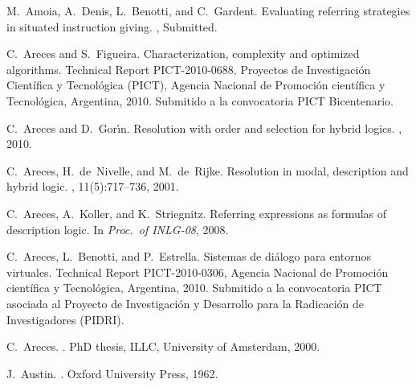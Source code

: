 \documentclass[11pt]{article}
\begin{document}
\begin{thebibliography}{} \renewcommand{\itemsep}{1mm}

M.~Amoia, A.~Denis, L.~Benotti, and C.~Gardent.
\newblock Evaluating referring strategies in situated instruction giving.
, Submitted.

C.~Areces and S.~Figueira.
\newblock Characterization, complexity and optimized algorithms.
\newblock Technical Report PICT-2010-0688, Proyectos de Investigación
  Cient\'ifica y Tecnol\'ogica (PICT), Agencia Nacional de Promoci\'on
  cient\'ifica y Tecnol\'ogica, Argentina, 2010.
\newblock Submitido a la convocatoria PICT Bicentenario.

C.~Areces and D.~Gor{\'\i}n.
\newblock Resolution with order and selection for hybrid logics.
,
  2010.

C.~Areces, H.~de~Nivelle, and M.~de~Rijke.
\newblock Resolution in modal, description and hybrid logic.
, 11(5):717--736, 2001.

C.~Areces, A.~Koller, and K.~Striegnitz.
\newblock Referring expressions as formulas of description logic.
\newblock In {\em Proc.\ of INLG-08}, 2008.

C.~Areces, L.~Benotti, and P.~Estrella.
\newblock Sistemas de di\'alogo para entornos virtuales.
\newblock Technical Report PICT-2010-0306, Agencia Nacional de Promoci\'on
  cient\'ifica y Tecnol\'ogica, Argentina, 2010.
\newblock Submitido a la convocatoria PICT asociada al Proyecto de
  Investigación y Desarrollo para la Radicaci\'on de Investigadores (PIDRI).

C.~Areces.
.
\newblock PhD thesis, ILLC, University of Amsterdam, 2000.

J.~Austin.
.
\newblock Oxford University Press, 1962.


\end{thebibliography}
\end{document}
